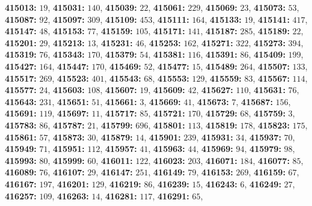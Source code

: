 \textsf{\bfseries 415013:} $19$, \textsf{\bfseries 415031:} $140$, \textsf{\bfseries 415039:} $22$, \textsf{\bfseries 415061:} $229$, \textsf{\bfseries 415069:} $23$, \textsf{\bfseries 415073:} $53$, \textsf{\bfseries 415087:} $92$, \textsf{\bfseries 415097:} $309$, \textsf{\bfseries 415109:} $453$, \textsf{\bfseries 415111:} $164$, \textsf{\bfseries 415133:} $19$, \textsf{\bfseries 415141:} $417$, \textsf{\bfseries 415147:} $48$, \textsf{\bfseries 415153:} $77$, \textsf{\bfseries 415159:} $105$, \textsf{\bfseries 415171:} $141$, \textsf{\bfseries 415187:} $285$, \textsf{\bfseries 415189:} $22$, \textsf{\bfseries 415201:} $29$, \textsf{\bfseries 415213:} $13$, \textsf{\bfseries 415231:} $46$, \textsf{\bfseries 415253:} $162$, \textsf{\bfseries 415271:} $322$, \textsf{\bfseries 415273:} $394$, \textsf{\bfseries 415319:} $76$, \textsf{\bfseries 415343:} $170$, \textsf{\bfseries 415379:} $54$, \textsf{\bfseries 415381:} $116$, \textsf{\bfseries 415391:} $86$, \textsf{\bfseries 415409:} $199$, \textsf{\bfseries 415427:} $164$, \textsf{\bfseries 415447:} $170$, \textsf{\bfseries 415469:} $52$, \textsf{\bfseries 415477:} $15$, \textsf{\bfseries 415489:} $264$, \textsf{\bfseries 415507:} $133$, \textsf{\bfseries 415517:} $269$, \textsf{\bfseries 415523:} $401$, \textsf{\bfseries 415543:} $68$, \textsf{\bfseries 415553:} $129$, \textsf{\bfseries 415559:} $83$, \textsf{\bfseries 415567:} $114$, \textsf{\bfseries 415577:} $24$, \textsf{\bfseries 415603:} $108$, \textsf{\bfseries 415607:} $19$, \textsf{\bfseries 415609:} $42$, \textsf{\bfseries 415627:} $110$, \textsf{\bfseries 415631:} $76$, \textsf{\bfseries 415643:} $231$, \textsf{\bfseries 415651:} $51$, \textsf{\bfseries 415661:} $3$, \textsf{\bfseries 415669:} $41$, \textsf{\bfseries 415673:} $7$, \textsf{\bfseries 415687:} $156$, \textsf{\bfseries 415691:} $119$, \textsf{\bfseries 415697:} $11$, \textsf{\bfseries 415717:} $85$, \textsf{\bfseries 415721:} $170$, \textsf{\bfseries 415729:} $68$, \textsf{\bfseries 415759:} $3$, \textsf{\bfseries 415783:} $86$, \textsf{\bfseries 415787:} $21$, \textsf{\bfseries 415799:} $696$, \textsf{\bfseries 415801:} $113$, \textsf{\bfseries 415819:} $178$, \textsf{\bfseries 415823:} $175$, \textsf{\bfseries 415861:} $57$, \textsf{\bfseries 415873:} $30$, \textsf{\bfseries 415879:} $14$, \textsf{\bfseries 415901:} $239$, \textsf{\bfseries 415931:} $34$, \textsf{\bfseries 415937:} $70$, \textsf{\bfseries 415949:} $71$, \textsf{\bfseries 415951:} $112$, \textsf{\bfseries 415957:} $41$, \textsf{\bfseries 415963:} $44$, \textsf{\bfseries 415969:} $94$, \textsf{\bfseries 415979:} $98$, \textsf{\bfseries 415993:} $80$, \textsf{\bfseries 415999:} $60$, \textsf{\bfseries 416011:} $122$, \textsf{\bfseries 416023:} $203$, \textsf{\bfseries 416071:} $184$, \textsf{\bfseries 416077:} $85$, \textsf{\bfseries 416089:} $76$, \textsf{\bfseries 416107:} $29$, \textsf{\bfseries 416147:} $251$, \textsf{\bfseries 416149:} $79$, \textsf{\bfseries 416153:} $269$, \textsf{\bfseries 416159:} $67$, \textsf{\bfseries 416167:} $197$, \textsf{\bfseries 416201:} $129$, \textsf{\bfseries 416219:} $86$, \textsf{\bfseries 416239:} $15$, \textsf{\bfseries 416243:} $6$, \textsf{\bfseries 416249:} $27$, \textsf{\bfseries 416257:} $109$, \textsf{\bfseries 416263:} $14$, \textsf{\bfseries 416281:} $117$, \textsf{\bfseries 416291:} $65$, 
